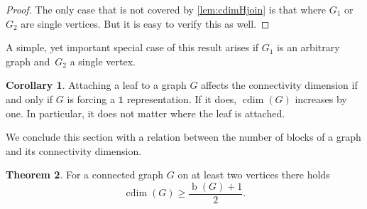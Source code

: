 \documentclass[letterpaper,12pt,headings=normal,parskip=half]{scrartcl}
\DeclareMathOperator{\cdim}{cdim}
\DeclareMathOperator{\blocks}{\text{$b$}}
\theoremstyle{definition}
\newtheorem{theorem}{Theorem}
\newtheorem{corollary}[theorem]{Corollary}
\begin{document}
\begin{proof}
    The only case that is not covered by \cref{lem:cdimHjoin} is that where $G_1$ or $G_2$ are single vertices. But it is easy to verify this as well.
\end{proof}

A simple, yet important special case of this result arises if $G_1$ is an arbitrary graph and~$G_2$ a single vertex.

\begin{corollary}\label{cor:attachaleaf}
    Attaching a leaf to a graph $G$ affects the connectivity dimension if and only if $G$ is forcing a $\mathds{1}$ representation.
    If it does, $\cdim(G)$ increases by one.
    In particular, it does not matter where the leaf is attached.
\end{corollary}

We conclude this section with a relation between the number of blocks of a graph and its connectivity dimension.

\begin{theorem}\label{thm:cdimblocksratio}
    For a connected graph $G$ on at least two vertices there holds 
    \begin{equation*}
        \cdim(G)\geq\frac{\blocks(G)+1}{2}.   
    \end{equation*}
\end{theorem}
\end{document}
